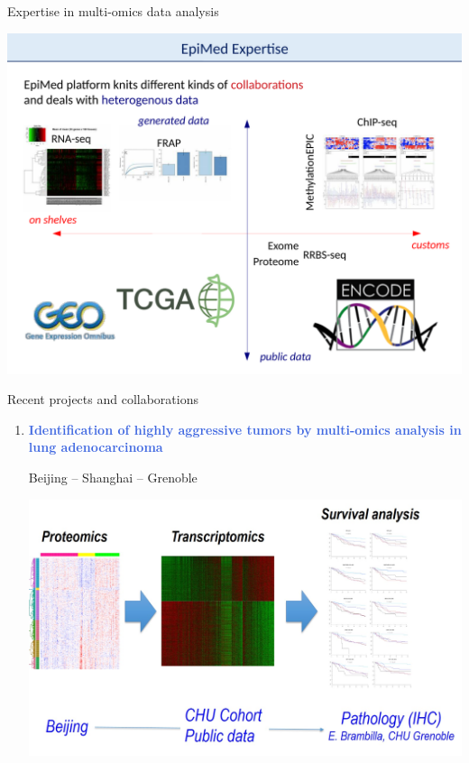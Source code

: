 \documentclass[final]{beamer}
\newlength{\twocolwid}
\begin{document}
\begin{frame}[t]
\begin{columns}[t]
\begin{column}{\twocolwid}
\begin{block}{Expertise in multi-omics data analysis}

{
\centering
\mbox{\includegraphics[trim = 0mm 0mm 0mm 43mm, clip, width=.99\linewidth]{figs/fig04}}

}

\end{block}







\begin{block}{Recent projects and collaborations}

\begin{enumerate}
	
	\item \textcolor{RoyalBlue}{\textbf{Identification of highly aggressive tumors by multi-omics analysis in lung adenocarcinoma}}

Beijing -- Shanghai -- Grenoble

\begin{center}
\includegraphics[width=\linewidth]{figs/proteomics_transcriptomics}
\end{center}


\end{enumerate}
\end{block}
\end{column}
\end{columns}
\end{frame}
\end{document}
